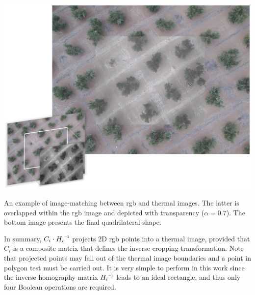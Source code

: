 \begin{marginfigure}[.1cm]
	\includegraphics{figs/thermal_projection/thermal_ecc_registration.png}
	\caption{An example of image-matching between \acrshort{rgb} and thermal images. The latter is overlapped within the \acrshort{rgb} image and depicted with transparency ($\alpha = 0.7$). The bottom image presents the final quadrilateral shape. }
	\label{fig:thermal_ecc_registration}
\end{marginfigure}
In summary, $C_{i} \cdot \inv{H_i}$ projects 2D \acrshort{rgb} points into a thermal image, provided that $C_{i}$ is a composite matrix that defines the inverse cropping transformation. Note that projected points may fall out of the thermal image boundaries and a point in polygon test must be carried out. It is very simple to perform in this work since the inverse homography matrix $\inv{H_i}$ leads to an ideal rectangle, and thus only four Boolean operations are required.  
